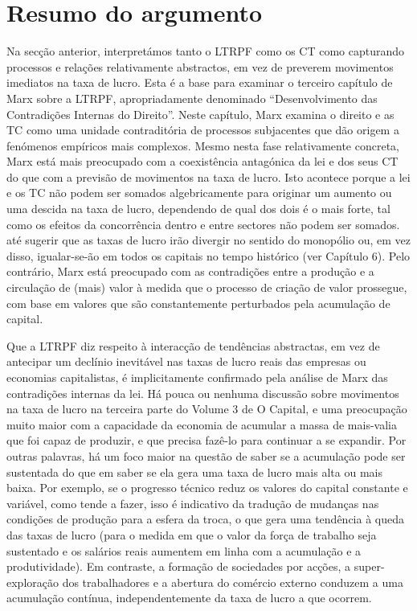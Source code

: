 \section{Resumo do argumento}
 \par 
Na secção anterior, interpretámos tanto o LTRPF como os CT como capturando processos e relações relativamente abstractos, em vez de preverem movimentos imediatos na taxa de lucro. Esta é a base para examinar o terceiro capítulo de Marx sobre a LTRPF, apropriadamente denominado “Desenvolvimento das Contradições Internas do Direito”. Neste capítulo, Marx examina o direito e as TC como uma unidade contraditória de processos subjacentes que dão origem a fenómenos empíricos mais complexos. Mesmo nesta fase relativamente concreta, Marx está mais preocupado com a coexistência antagónica da lei e dos seus CT do que com a previsão de movimentos na taxa de lucro. Isto acontece porque a lei e os TC não podem ser somados algebricamente para originar um aumento ou uma descida na taxa de lucro, dependendo de qual dos dois é o mais forte, tal como os efeitos da concorrência dentro e entre sectores não podem ser somados. até sugerir que as taxas de lucro irão divergir no sentido do monopólio ou, em vez disso, igualar-se-ão em todos os capitais no tempo histórico (ver Capítulo {\color{blue}6}). Pelo contrário, Marx está preocupado com as contradições entre a produção e a circulação de (mais) valor à medida que o processo de criação de valor prossegue, com base em valores que são constantemente perturbados pela acumulação de capital.
 \par 
Que a LTRPF diz respeito à interacção de tendências abstractas, em vez de antecipar um declínio inevitável nas taxas de lucro reais das empresas ou economias capitalistas, é implicitamente confirmado pela análise de Marx das contradições internas da lei. Há pouca ou nenhuma discussão sobre movimentos na taxa de lucro na terceira parte do Volume {\color{blue}3} de O Capital, e uma preocupação muito maior com a capacidade da economia de acumular a massa de mais-valia que foi capaz de produzir, e que precisa fazê-lo para continuar a se expandir. Por outras palavras, há um foco maior na questão de saber se a acumulação pode ser sustentada do que em saber se ela gera uma taxa de lucro mais alta ou mais baixa. Por exemplo, se o progresso técnico reduz os valores do capital constante e variável, como tende a fazer, isso é indicativo da tradução de mudanças nas condições de produção para a esfera da troca, o que gera uma tendência à queda das taxas de lucro (para o medida em que o valor da força de trabalho seja sustentado e os salários reais aumentem em linha com a acumulação e a produtividade). Em contraste, a formação de sociedades por acções, a super-exploração dos trabalhadores e a abertura do comércio externo conduzem a uma acumulação contínua, independentemente da taxa de lucro a que ocorrem.
 \par 
